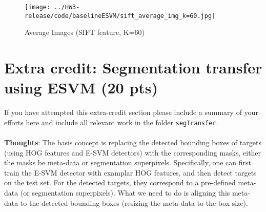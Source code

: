 \documentclass[12pt]{article}
\newcounter{list}
\begin{document}
\begin{figure}[H]
  \centering \texttt{[image: ../HW3-release/code/baselineESVM/sift\_average\_img\_k=60.jpg]}
  \caption{Average Images (SIFT feature, K=60)}
\end{figure}



\section{Extra credit: Segmentation transfer using ESVM (20 pts)}

If you have attempted this extra-credit section please include a summary of your efforts here and include all relevant
work in the folder \texttt{segTransfer}.\\
\\
\textbf{Thoughts}: The basis concept is replacing the detected bounding boxes of targets (using HOG features and E-SVM detectors) with the corresponding masks, either the masks be meta-data or segmentation superpixels. Specifically, one can first train the E-SVM detector with examplar HOG features, and then detect targets on the test set. For the detected targets, they correspond to a pre-defined meta-data (or segmentation superpixels). What we need to do is aligning this meta-data to the detected bounding boxes (resizing the meta-data to the box size). 

 

\end{document}

